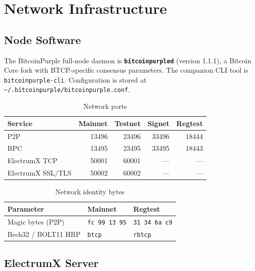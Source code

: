 \documentclass[12pt, a4paper]{article}
\begin{document}
\newpage
\section{Network Infrastructure}

\subsection{Node Software}

The BitcoinPurple full-node daemon is \textbf{\texttt{bitcoinpurpled}} (version
1.1.1), a Bitcoin Core fork with BTCP-specific consensus parameters.  The
companion CLI tool is \texttt{bitcoinpurple-cli}.  Configuration is stored at
\texttt{\textasciitilde/.bitcoin\allowbreak purple/bitcoin\allowbreak purple.conf}.

\begin{table}[h!]
\centering
\caption{Network ports}
\begin{tabular}{@{}lrrrr@{}}
\toprule
\textbf{Service} & \textbf{Mainnet} & \textbf{Testnet} & \textbf{Signet} & \textbf{Regtest} \\
\midrule
P2P               & 13496 & 23496 & 33496 & 18444 \\
RPC               & 13495 & 23495 & 33495 & 18443 \\
ElectrumX TCP     & 50001 & 60001 & —     & — \\
ElectrumX SSL/TLS & 50002 & 60002 & —     & — \\
\bottomrule
\end{tabular}
\end{table}

\begin{table}[h!]
\centering
\caption{Network identity bytes}
\begin{tabular}{@{}lll@{}}
\toprule
\textbf{Parameter} & \textbf{Mainnet} & \textbf{Regtest} \\
\midrule
Magic bytes (P2P) & \texttt{fc 99 13 95} & \texttt{31 34 6a c9} \\
Bech32 / BOLT11 HRP & \texttt{btcp} & \texttt{rbtcp} \\
\bottomrule
\end{tabular}
\end{table}

\subsection{ElectrumX Server}
\end{document}
